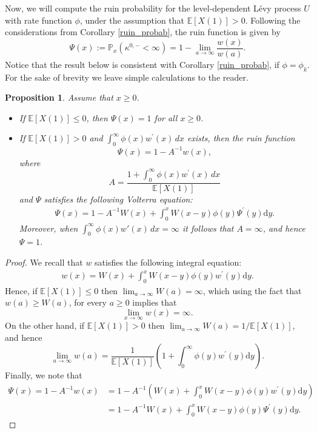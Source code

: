 \documentclass[12pt,reqno]{amsart}
\newtheorem{prop}[theorem]{Proposition}
\theoremstyle{definition}
\theoremstyle{remark}
\newcommand{\md}{\mathrm{d}}
\begin{document}
Now, we will compute the ruin probability for the level-dependent L\'evy process $U$ with rate function $\phi$, under the assumption 
that $\mathbb{E}[X(1)]>0$.
Following the considerations from Corollary \ref{ruin_probab},
the ruin function is given by
$$\Psi(x):=\mathbb{P}_x\left(\kappa^{0,-}<\infty\right)=1- \lim_{a\to\infty}\frac{w(x)}{w(a)}.$$
 Notice that the result below is consistent with Corollary
  \ref{ruin_probab}, if $\phi=\phi_k$. For the sake of brevity we leave simple calculations to the reader.
\begin{prop} 
Assume that $x\geq0$.
\begin{itemize}
	\item[(i)] If $\mathbb{E}[X(1)]\leq  0$, then $\Psi(x)=1$ for all $x\geq0$.
  \item[(ii)] If $\mathbb{E}[X(1)]>0$ and 
  $\int_0^\infty \phi(x)w^{\prime}(x)\,dx$ exists, then
  the ruin function
  $$\Psi(x)=1-A^{-1}w(x),$$
  where
  $$A=\frac{1+\int_0^\infty \phi(x)w^{\prime}(x)\,dx}{\mathbb{E}[X(1)]}$$
and $\Psi$ satisfies the following Volterra equation:
  \begin{align*}
  \Psi(x)=1-A^{-1}W(x)+\int_0^xW(x-y)\phi(y)\Psi^{\prime}(y)\md y.
  \end{align*}
  Moreover, when $\int_0^\infty \phi(x)w'(x)\,dx = \infty$ it follows that $A=\infty$, and hence $\Psi=1$. 
\end{itemize}
\end{prop}
\begin{proof}
We recall that $w$ satisfies the following integral equation:
\begin{align*}
w(x)=W(x)+\int_0^xW(x-y)\phi(y)w^{\prime}(y) \md y.
\end{align*}
Hence, if $\mathbb{E}[X(1)]\leq0$ then $\lim_{a\to\infty}W(a)=\infty$, which using the fact that $w(a)\geq W(a)$, for every $a\geq 0$ implies that
\[
\lim_{x\to\infty}w(x)=\infty.
\]
On the other hand, if $\mathbb{E}[X(1)]>0$ then $\lim_{a\to\infty}W(a)=1/\mathbb{E}[X(1)]$, and hence
\begin{equation}
\lim_{a\to\infty}w(a)=\frac{1}{\mathbb{E}[X(1)]}\left(1+\int_0^{\infty}\phi(y)w^{\prime}(y)\md y\right).
	\end{equation}
Finally, we note that
\begin{align*}
\Psi(x)=1-A^{-1}w(x)&=1-A^{-1}\left(W(x)+\int_0^xW(x-y)\phi(y)w^{\prime}(y) \md y\right)\\
&=1-A^{-1}W(x)+\int_0^xW(x-y)\phi(y)\Psi^{\prime}(y)\md y.
\end{align*}
\end{proof}
\end{document}
